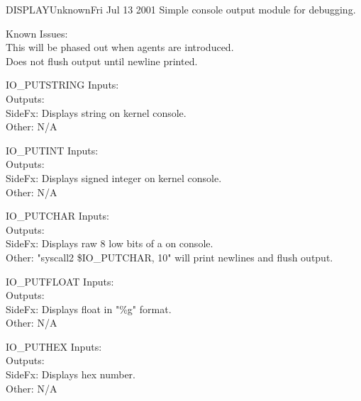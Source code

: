 \begin{scmodule}{DISPLAY}{Unknown}{\perjsk}{Fri Jul 13 2001}
Simple console output module for debugging.
\end{scmodule}
Known Issues:\\
This will be phased out when agents are introduced.\\
Does not flush output until newline printed.
\begin{sccall}[]{IO\_PUTSTRING}
  Inputs: \\
 Outputs: \scargs{}\\
  SideFx: Displays string on kernel console.\\
   Other: N/A
\end{sccall}
\begin{sccall}{IO\_PUTINT}
  Inputs: \\
 Outputs: \scargs{}\\
  SideFx: Displays signed integer on kernel console.\\
   Other: N/A
\end{sccall}
\begin{sccall}{IO\_PUTCHAR}
  Inputs: \\
 Outputs: \scargs{}\\
  SideFx: Displays raw 8 low bits of a on console.\\
   Other: "syscall2 \$IO\_PUTCHAR, 10" will print newlines and flush output. 
\end{sccall}
\begin{sccall}{IO\_PUTFLOAT}
  Inputs: \\
 Outputs: \scargs{}\\
  SideFx: Displays float in "\%g" format.\\
   Other: N/A 
\end{sccall}
\begin{sccall}{IO\_PUTHEX}
  Inputs: \\
 Outputs: \scargs{}\\
  SideFx: Displays hex number.\\
   Other: N/A 
\end{sccall}
